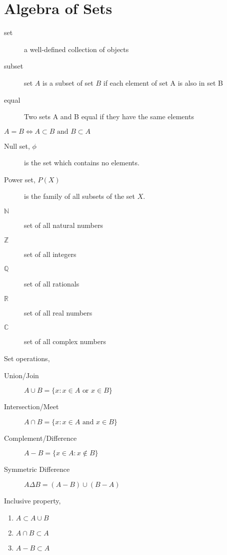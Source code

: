 \section{Algebra of Sets}
	\begin{definition}
		\begin{description}
			\item[set] a well-defined collection of objects
			\item[subset] set $A$ is a subset of set $B$ if each element of set A is also in set B
			\item[equal] Two sets A and B equal if they have the same elements
		\end{description}
	\end{definition}
	\begin{remark}
		$A = B \iff A \subset B \text{ and } B \subset A$
	\end{remark}
	\begin{description}	
		\item[Null set, $\phi$] is the set which contains no elements.
		\item[Power set, $P(X)$] is the family of all subsets of the set $X$.
		\item[$\mathbb{N}$] set of all natural numbers
		\item[$\mathbb{Z}$] set of all integers
		\item[$\mathbb{Q}$] set of all rationals
		\item[$\mathbb{R}$] set of all real numbers
		\item[$\mathbb{C}$] set of all complex numbers
	\end{description}
	\begin{definition}
		Set operations,
		\begin{description}
			\item[Union/Join] $A \cup B = \{ x : x \in A \text{ or } x \in B \}$
			\item[Intersection/Meet] $A \cap B = \{ x : x \in A \text{ and } x \in B \}$
			\item[Complement/Difference] $A - B = \{ x \in A : x \not\in B \}$
			\item[Symmetric Difference] $A \Delta B = (A-B) \cup (B-A)$
		\end{description}
	\end{definition}
	\begin{remark}Inclusive property,
		\begin{enumerate}
			\item $A \subset A \cup B$
			\item $A \cap B \subset A$
			\item $A-B \subset A$
		\end{enumerate}
	\end{remark}
